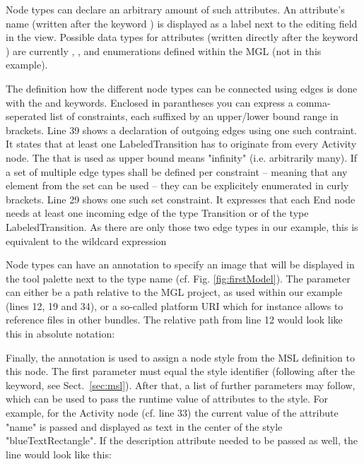 \documentclass[a4paper,american,12pt]{scrreprt}
\begin{document}
Node types can declare an arbitrary amount of such attributes. An attribute's
name (written after the keyword ) is displayed as a label next to the
editing field in the  view. Possible data types for attributes
(written directly after the keyword ) are currently ,
,  and enumerations defined within the MGL (not in this
example).%

\FloatBarrier

The definition how the different node types can be connected using edges is
done with the  and  keywords.
Enclosed in parantheses you can express a comma-seperated list of constraints,
each suffixed by an upper/lower bound range in brackets. Line 39 shows a 
declaration of outgoing edges using one such contraint. It states that at least
one LabeledTransition has to originate from every Activity node. The \code{*}
that is used as upper bound means "infinity" (i.e. arbitrarily many). If a set
of multiple edge types shall be defined per constraint -- meaning that any
element from the set can be used -- they can be explicitely enumerated
in curly brackets. Line 29 shows one such set constraint. It expresses that each
End node needs at least one incoming edge of the type Transition or of the type
LabeledTransition. As there are only those two edge types in our example, this
is equivalent to the wildcard expression \code{(*[1 ,*])}

Node types can have an  annotation to specify an image that will be
displayed in the tool palette next to the type name (cf. Fig.
\ref{fig:firstModel}). The parameter can either be a path relative to the MGL
project, as used within our example (lines 12, 19 and 34), or a so-called
platform URI which for instance allows to reference files in other bundles. The
relative path from line 12 would look like this in absolute notation:



Finally, the  annotation is used to assign a node style from the
MSL definition to this node. The first parameter must equal the style identifier
(following after the  keyword, see Sect.~\ref{sec:msl}). After
that, a list of further parameters may follow, which can be used to pass the
runtime value of attributes to the style. For example, for the Activity node
(cf. line 33) the current value of the attribute "name" is passed and displayed
as text in the center of the style "blueTextRectangle". If the description
attribute needed to be passed as well, the line would look like this:
\end{document}

